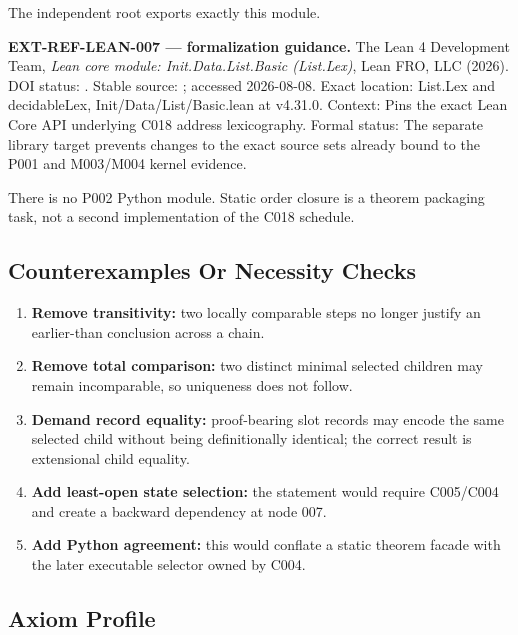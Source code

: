 The independent root \texttt{\protect{}} exports
exactly this module.

\textbf{EXT-REF-LEAN-007 --- formalization guidance.} The Lean 4
Development Team, \emph{Lean core module: Init.Data.List.Basic
(List.Lex)}, Lean FRO, LLC (2026). DOI status:
\texttt{\protect{}}. Stable source:
\texttt{\protect{}};
accessed 2026-08-08. Exact location: List.Lex and decidableLex,
Init/Data/List/Basic.lean at v4.31.0. Context: Pins the exact Lean Core
API underlying C018 address lexicography. Formal status:
\texttt{\protect{}} The
separate library target prevents changes to the exact source sets
already bound to the P001 and M003/M004 kernel evidence.

There is no P002 Python module. Static order closure is a theorem
packaging task, not a second implementation of the C018 schedule.

\subsection{Counterexamples Or Necessity
Checks}\label{counterexamples-or-necessity-checks-1}

\begin{enumerate}
\def\labelenumi{\arabic{enumi}.}
\tightlist
\item
  \textbf{Remove transitivity:} two locally comparable steps no longer
  justify an earlier-than conclusion across a chain.
\item
  \textbf{Remove total comparison:} two distinct minimal selected
  children may remain incomparable, so uniqueness does not follow.
\item
  \textbf{Demand record equality:} proof-bearing slot records may encode
  the same selected child without being definitionally identical; the
  correct result is extensional child equality.
\item
  \textbf{Add least-open state selection:} the statement would require
  C005/C004 and create a backward dependency at node 007.
\item
  \textbf{Add Python agreement:} this would conflate a static theorem
  facade with the later executable selector owned by C004.
\end{enumerate}

\subsection{Axiom Profile}\label{axiom-profile-1}

